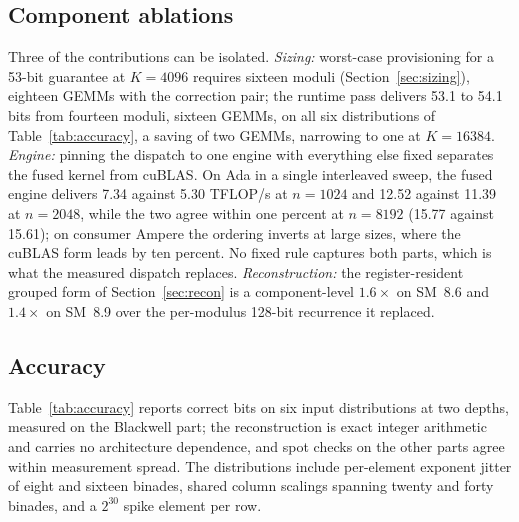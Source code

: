 \documentclass[11pt]{amsart}
\theoremstyle{plain}
\theoremstyle{definition}
\begin{document}
\subsection{Component ablations}\label{sec:ablation}

Three of the contributions can be isolated. \emph{Sizing:} worst-case
provisioning for a 53-bit guarantee at $K = 4096$ requires sixteen moduli
(Section~\ref{sec:sizing}), eighteen GEMMs with the correction pair; the
runtime pass delivers 53.1 to 54.1 bits from fourteen moduli, sixteen
GEMMs, on all six distributions of Table~\ref{tab:accuracy}, a saving of
two GEMMs, narrowing to one at $K = 16384$. \emph{Engine:} pinning the
dispatch to one engine with everything else fixed separates the fused
kernel from cuBLAS. On Ada in a single interleaved sweep, the fused
engine delivers 7.34 against 5.30 TFLOP/s at $n = 1024$ and 12.52 against
11.39 at $n = 2048$, while the two agree within one percent at
$n = 8192$ (15.77 against 15.61); on consumer Ampere the ordering
inverts at large sizes, where the cuBLAS form leads by ten percent. No
fixed rule captures both parts, which is what the measured dispatch
replaces. \emph{Reconstruction:} the register-resident grouped form of
Section~\ref{sec:recon} is a component-level $1.6\times$ on SM~8.6 and
$1.4\times$ on SM~8.9 over the per-modulus 128-bit recurrence it
replaced.

\subsection{Accuracy}\label{sec:accuracy}

Table~\ref{tab:accuracy} reports correct bits on six input distributions
at two depths, measured on the Blackwell part; the reconstruction is
exact integer arithmetic and carries no architecture dependence, and spot
checks on the other parts agree within measurement spread. The
distributions include per-element exponent jitter of eight and sixteen
binades, shared column scalings spanning twenty and forty binades, and a
$2^{30}$ spike element per row.
\end{document}
